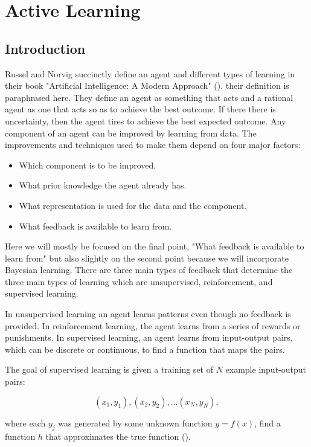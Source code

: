 \chapter{Active Learning}



\section{Introduction}
Russel and Norvig succinctly define an agent and different types of learning in their book "Artificial Intelligence: A Modern Approach" (\cite{russell2009artificial}), their definition is paraphrased here. They define an agent as something that acts and a rational agent as one that acts so as to achieve the best outcome. If there there is uncertainty, then the agent tires to achieve the best expected outcome. Any component of an agent can be improved by learning from data. The improvements and techniques used to make them depend on four major factors:

\begin{itemize}
  \item Which component is to be improved.
  \item What prior knowledge the agent already has.
  \item What representation is used for the data and the component.
  \item What feedback is available to learn from.  
\end{itemize}

Here we will mostly be focused on the final point, "What feedback is available to learn from" but also slightly on the second point because we will incorporate Bayesian learning. There are three main types of feedback that determine the three main types of learning which are unsupervised, reinforcement, and supervised learning. 

In unsupervised learning an agent learns patterns even though no feedback is provided. In reinforcement learning, the agent learns from a series of rewards or punishments. In supervised learning, an agent learns from input-output pairs, which can be discrete or continuous, to find a function that maps the pairs. 

The goal of supervised learning is given a training set of $N$ example input-output pairs:

\[(x_1, y_1), (x_2,y_2),... (x_N,y_N),\]

where each $y_j$ was generated by some unknown function $y=f(x)$, find a function $h$ that approximates the true function
(\cite{russell2009artificial}).

